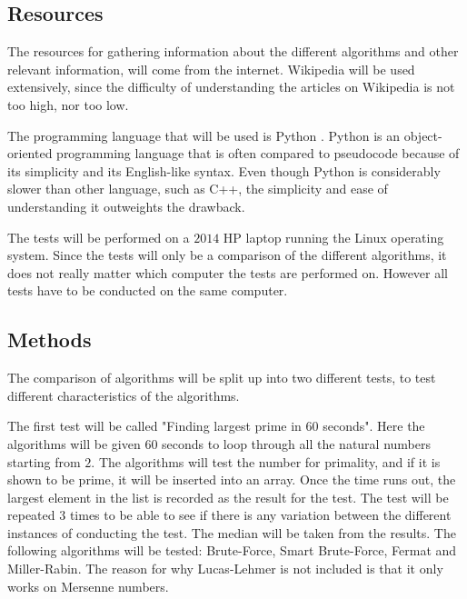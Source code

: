 \documentclass[main.tex]{subfiles}
\begin{document}
\subsection{Resources}
The resources for gathering information about the different algorithms and other
relevant information, will come from the internet. Wikipedia \cite{wikipedia}
will be used extensively, since the difficulty of understanding the articles on
Wikipedia is not too high, nor too low. \newline

The programming language that will be used is Python \cite{python}. Python is an
object-oriented programming language that is often compared to pseudocode
because of its simplicity and its English-like syntax. Even though Python is
considerably slower \cite{pythonvscpp} than other language, such as C++\cite{cpp},
the simplicity and ease of understanding it outweights the drawback. \newline

The tests will be performed on a $2014$ HP laptop running the Linux operating
system. Since the tests will only be a comparison of the different algorithms,
it does not really matter which computer the tests are performed on. However all
tests have to be conducted on the same computer.

\subsection{Methods}
The comparison of algorithms will be split up into two different tests, to test
different characteristics of the algorithms. \newline

The first test will be called "Finding largest prime in $60$ seconds". Here the
algorithms will be given $60$ seconds to loop through all the natural numbers
starting from $2$. The algorithms will test the number for primality, and if it
is shown to be prime, it will be inserted into an array. Once the time runs out,
the largest element in the list is recorded as the result for the test. The test
will be repeated $3$ times to be able to see if there is any variation between
the different instances of conducting the test. The median will be taken from
the results. The following algorithms will be tested: Brute-Force, Smart
Brute-Force, Fermat and Miller-Rabin. The reason for why Lucas-Lehmer is not
included is that it only works on Mersenne numbers. \newline
\end{document}
